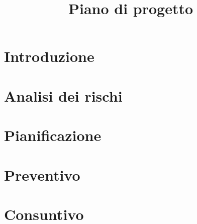 \documentclass{article}
\title{Piano di progetto}
\begin{document}


\maketitle

  \section{Introduzione}
  \label{sec:introduzione}
	
  \newpage
  \section{Analisi dei rischi}
  \label{sec:analisi_dei_rischi}
	
  \newpage
  \section{Pianificazione}
  \label{sec:pianificazione}
	
  \newpage
  \section{Preventivo}
  \label{sec:preventivo}
	
  \newpage
  \section{Consuntivo}
  \label{sec:consuntivo}
	
  \newpage
\end{document}
